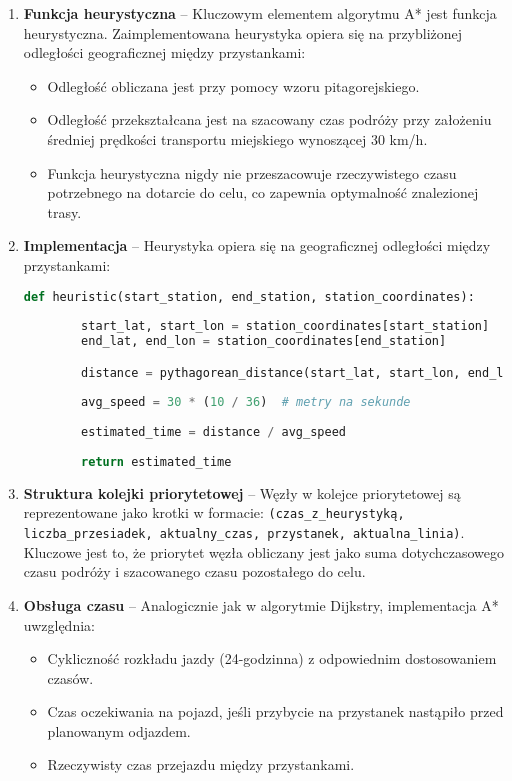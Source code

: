 \documentclass[12pt,a4paper]{article}
\begin{document}
\begin{enumerate}    
    \item \textbf{Funkcja heurystyczna} -- Kluczowym elementem algorytmu A* jest funkcja heurystyczna. Zaimplementowana heurystyka opiera się na przybliżonej odległości geograficznej między przystankami:
    \begin{itemize}
        \item Odległość obliczana jest przy pomocy wzoru pitagorejskiego.
        \item Odległość przekształcana jest na szacowany czas podróży przy założeniu średniej prędkości transportu miejskiego wynoszącej 30 km/h.
        \item Funkcja heurystyczna nigdy nie przeszacowuje rzeczywistego czasu potrzebnego na dotarcie do celu, co zapewnia optymalność znalezionej trasy.
    \end{itemize}
    
    \item \textbf{Implementacja} -- Heurystyka opiera się na geograficznej odległości między przystankami:
    \begin{lstlisting}[language=Python]
    def heuristic(start_station, end_station, station_coordinates):
   
        start_lat, start_lon = station_coordinates[start_station]
        end_lat, end_lon = station_coordinates[end_station]

        distance = pythagorean_distance(start_lat, start_lon, end_lat, end_lon)
        
        avg_speed = 30 * (10 / 36)  # metry na sekunde
    
        estimated_time = distance / avg_speed
        
        return estimated_time
    \end{lstlisting}
    
    \item \textbf{Struktura kolejki priorytetowej} -- Węzły w kolejce priorytetowej są reprezentowane jako krotki w formacie: \texttt{(czas\_z\_heurystyką, liczba\_przesiadek, aktualny\_czas, przystanek, aktualna\_linia)}. Kluczowe jest to, że priorytet węzła obliczany jest jako suma dotychczasowego czasu podróży i szacowanego czasu pozostałego do celu.
    
    \item \textbf{Obsługa czasu} -- Analogicznie jak w algorytmie Dijkstry, implementacja A* uwzględnia:
    \begin{itemize}
        \item Cykliczność rozkładu jazdy (24-godzinna) z odpowiednim dostosowaniem czasów.
        \item Czas oczekiwania na pojazd, jeśli przybycie na przystanek nastąpiło przed planowanym odjazdem.
        \item Rzeczywisty czas przejazdu między przystankami.
    \end{itemize}
    

\end{enumerate}
\end{document}
